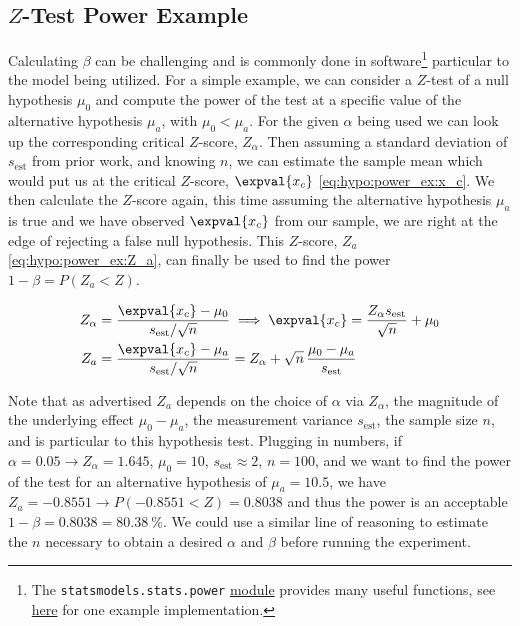 \subsection{\texorpdfstring{$Z$}{Z}-Test Power Example}
\label{hypo:power:Z_example}

Calculating $\beta$ can be challenging and is commonly done in software\footnote{The \texttt{statsmodels.stats.power}
\href{https://www.statsmodels.org/dev/stats.html?highlight=statsmodels\%20stats\%20power\#power-and-sample-size-calculations}{module}
provides many useful functions, see \href{https://machinelearningmastery.com/statistical-power-and-power-analysis-in-python/}{here} for one example implementation.} particular to the model being utilized.
For a simple example, we can consider a $Z$-test of a null hypothesis $\mu_{0}$
and compute the power of the test at a specific value of the alternative hypothesis $\mu_{a}$, with $\mu_{0} < \mu_{a}$.
For the given $\alpha$ being used we can look up the corresponding critical $Z$-score, $Z_{\alpha}$.
Then assuming a standard deviation of $s_{\text{est}}$ from prior work,
and knowing $n$, we can estimate the sample mean
which would put us at the critical $Z$-score, $\expval{x_{c}}$ \cref{eq:hypo:power_ex:x_c}.
We then calculate the $Z$-score again, this time assuming the alternative hypothesis $\mu_{a}$ is true
and we have observed $\expval{x_{c}}$ from our sample, \ie we are right at the edge of rejecting a false null hypothesis.
This $Z$-score, $Z_{a}$ \cref{eq:hypo:power_ex:Z_a}, can finally be used to find the power $1-\beta = P\left(Z_{a} < Z\right)$.

\begin{subequations}\label{eq:hypo:power_ex}
\begin{align}
Z_{\alpha} &= \frac{\expval{x_{c}} - \mu_{0}}{s_{\text{est}} / \sqrt{n}} \implies
\expval{x_{c}} = \frac{Z_{\alpha} s_{\text{est}}}{\sqrt{n}} + \mu_{0} \label{eq:hypo:power_ex:x_c} \\
Z_{a} &= \frac{\expval{x_{c}} - \mu_{a}}{s_{\text{est}} / \sqrt{n}}
= Z_{\alpha} + \sqrt{n}\,\frac{\mu_{0} - \mu_{a}}{s_{\text{est}}} \label{eq:hypo:power_ex:Z_a}
\end{align}
\end{subequations}

Note that as advertised $Z_{a}$ depends on
the choice of $\alpha$ via $Z_{\alpha}$,
the magnitude of the underlying effect $\mu_{0} - \mu_{a}$,
the measurement variance $s_{\text{est}}$,
the sample size $n$,
and is particular to this hypothesis test.
Plugging in numbers, if
$\alpha = \num{0.05} \to Z_{\alpha} = \num{1.645}$,
$\mu_{0} = \num{10}$,
$s_{\text{est}} \approx \num{2}$,
$n = \num{100}$,
and we want to find the power of the test for an alternative hypothesis of $\mu_{a} = \num{10.5}$,
we have $Z_{a} = \num{-0.8551} \to P\left(\num{-0.8551} < Z\right) = \num{0.8038}$
and thus the power is an acceptable $1-\beta = \num{0.8038} = \SI{80.38}{\percent}$.
We could use a similar line of reasoning to estimate
the $n$ necessary to obtain a desired $\alpha$ and $\beta$ before running the experiment.

